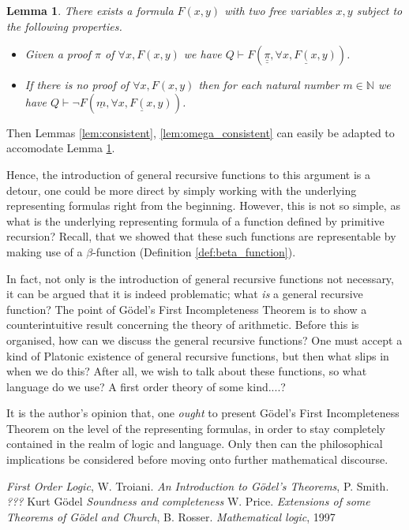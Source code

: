 \documentclass[12pt]{article}
\theoremstyle{plain}
\newtheorem{lemma}[thm]{Lemma}
\theoremstyle{definition}
\newcommand{\bb}[1]{\mathbb{#1}}
\begin{document}
	\begin{lemma}\label{lem:existence_Godel}
		There exists a formula $F(x,y)$ with two free variables $x,y$ subject to the following properties.
		\begin{itemize}
			\item Given a proof $\pi$ of $\forall x, F(x,y)$ we have $Q \vdash F(\underline{\underline{\pi}},\underline{\forall x, F(x,y)})$.
			\item If there is no proof of $\forall x, F(x,y)$ then for each natural number $m \in \bb{N}$ we have $Q \vdash \neg F(\underline{m},\underline{\forall x, F(x,y)})$.
		\end{itemize} 
	\end{lemma}
	Then Lemmas \ref{lem:consistent}, \ref{lem:omega_consistent} can easily be adapted to accomodate Lemma \ref{lem:existence_Godel}.
	
	Hence, the introduction of general recursive functions to this argument is a detour, one could be more direct by simply working with the underlying representing formulas right from the beginning. However, this is not so simple, as what is the underlying representing formula of a function defined by primitive recursion? Recall, that we showed that these such functions are representable by making use of a $\beta$-function (Definition \ref{def:beta_function}).
	
	In fact, not only is the introduction of general recursive functions not necessary, it can be argued that it is indeed problematic; what \emph{is} a general recursive function? The point of G\"{o}del's First Incompleteness Theorem is to show a counterintuitive result concerning the theory of arithmetic. Before this is organised, how can we discuss the general recursive functions? One must accept a kind of Platonic existence of general recursive functions, but then what slips in when we do this? After all, we wish to talk about these functions, so what language do we use? A first order theory of some kind....?
	
	It is the author's opinion that, one \emph{ought} to present G\"{o}del's First Incompleteness Theorem on the level of the representing formulas, in order to stay completely contained in the realm of logic and language. Only then can the philosophical implications be considered before moving onto further mathematical discourse.
	
	
	\begin{thebibliography}{9}
		 \emph{First Order Logic}, W. Troiani.
		 \emph{An Introduction to G\"{o}del's Theorems}, P. Smith.
		 \emph{???} Kurt G\"{o}del
		 \emph{Soundness and completeness} W. Price.
		 \emph{Extensions of some Theorems of G\"{o}del and Church}, B. Rosser.
		 \emph{Mathematical logic}, 1997
	\end{thebibliography}
	
	
	
	
	
	
	
\end{document}
